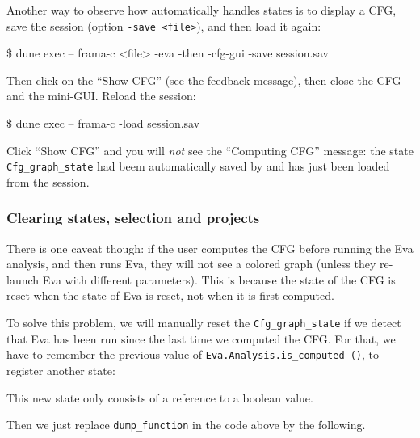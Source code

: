 Another way to observe how \framac automatically handles states is to display a
CFG, save the session (option \verb|-save <file>|), and then load it again:

\begin{frama-c-commands}
\$ dune exec -- frama-c <file> -eva -then -cfg-gui -save session.sav
\end{frama-c-commands}

Then click on the ``Show CFG'' (see the feedback message), then close the CFG
and the mini-GUI. Reload the session:

\begin{frama-c-commands}
\$ dune exec -- frama-c -load session.sav
\end{frama-c-commands}

Click ``Show CFG'' and you will {\em not} see the ``Computing CFG'' message:
the state \texttt{Cfg\_graph\_state} had beem automatically saved by \framac
and has just been loaded from the session.

\subsubsection{Clearing states, selection and projects}

There is one caveat though: if the user computes the CFG before
running the \textsf{Eva} analysis, and then runs \textsf{Eva}, they
will not see a colored graph (unless they re-launch \textsf{Eva}
with different parameters). This is because the state of the
CFG is reset when the state of \textsf{Eva} is reset, not when it is
first computed.

To solve this problem, we will manually reset the
\texttt{Cfg\_graph\_state} if we detect that \textsf{Eva}
has been run since the last time we computed the CFG. For
that, we have to remember the previous value of
\texttt{Eva.Analysis.is\_computed ()}, \ie to register another state:


This new state only consists of a reference to a boolean value.

Then we just replace \texttt{dump\_function} in the code above by the
following.


